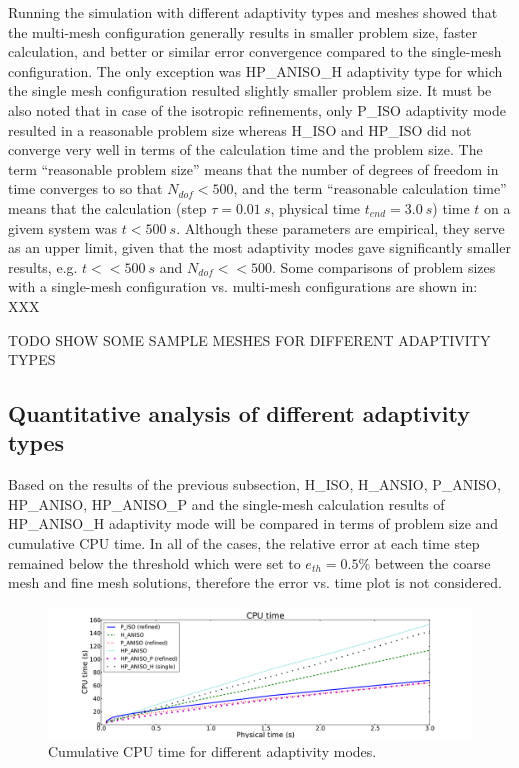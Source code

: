 Running the simulation with different adaptivity
types and meshes showed that the multi-mesh configuration generally results in
smaller problem size, faster calculation, and better or similar error convergence
compared to the single-mesh configuration. The only exception was HP\_ANISO\_H
adaptivity type for which the single mesh configuration resulted slightly
smaller problem size. It must be also noted that in case of the
isotropic refinements, only P\_ISO adaptivity mode resulted in a
reasonable problem size whereas H\_ISO and HP\_ISO did not converge
very well in terms of the calculation time and the problem size.
The term ``reasonable problem size''
means that the number of degrees of freedom in time converges
to so that $N_{dof}<500$, and the term ``reasonable calculation time''
means that the calculation (step $\tau=0.01\ s$, physical
time $t_{end}=3.0\ s$) time $t$ on a givem system was $t<500\ s$.
Although these parameters are empirical, they serve as an upper limit, given
that the most adaptivity modes gave significantly smaller results,
e.g. $t<<500\ s$ and $N_{dof} << 500$.
Some comparisons of problem sizes with a single-mesh configuration
vs. multi-mesh configurations are shown in: XXX

TODO SHOW SOME SAMPLE MESHES FOR DIFFERENT ADAPTIVITY TYPES


\subsection{Quantitative analysis of different adaptivity types}

Based on the results of the previous subsection, H\_ISO, H\_ANSIO, P\_ANISO,
HP\_ANISO, HP\_ANISO\_P and the single-mesh calculation results of HP\_ANISO\_H
adaptivity mode will be compared in terms of problem size and cumulative
CPU time. In all of the cases, the relative 
error at each time step remained below
the threshold which were set to $e_{th}=0.5\%$ between the coarse mesh
and fine mesh solutions, therefore the error vs. time plot is not considered.

\begin{figure}
  \begin{centering}
  \includegraphics[width=\columnwidth]{cpu}
  \caption{\label{fig:cpu} Cumulative CPU time for different adaptivity modes.}
  \end{centering}
\end{figure}

